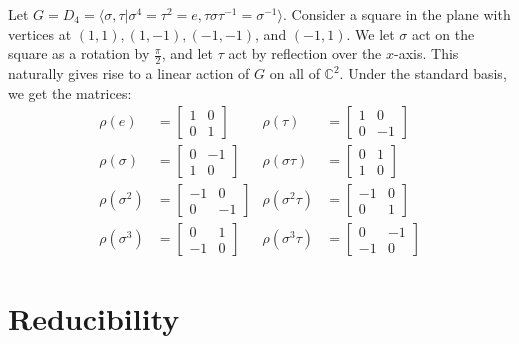 \begin{frame}[plain]
\begin{example}
Let $G = D_4 = \langle \sigma, \tau |  \sigma^4 = \tau^2 = e, \tau \sigma \tau^{-1} = \sigma^{-1} \rangle$.  \pause Consider a square in the plane with vertices at $(1,1), (1,-1), (-1, -1)$, and $(-1, 1)$.  \pause We let $\sigma$ act on the square as a rotation by $\frac{\pi}{2}$, and let $\tau$ act by reflection over the $x$-axis.  This naturally gives rise to a linear action of $G$ on all of $\mathbb{C}^2$.  \pause  Under the standard basis, we get the matrices:
\begin{align*}
\rho( e) &= \begin{bmatrix} 1 & 0 \\ 0 & 1\end{bmatrix}  &\rho (\tau) &= \begin{bmatrix} 1 & 0 \\ 0 & -1\end{bmatrix} \\
\rho (\sigma) &= \begin{bmatrix} 0 & -1 \\ 1 & 0  \end{bmatrix} & \rho (\sigma \tau ) &= \begin{bmatrix} 0 & 1 \\ 1 & 0\end{bmatrix} \\
\rho (\sigma^2) &= \begin{bmatrix} -1 & 0 \\ 0 & -1  \end{bmatrix} & \rho (\sigma^2 \tau) &= \begin{bmatrix} -1 & 0 \\ 0 & 1\end{bmatrix} \\
\rho (\sigma^3) &= \begin{bmatrix} 0 & 1 \\ -1 & 0  \end{bmatrix} & \rho (\sigma^3 \tau) &= \begin{bmatrix} 0 & -1 \\ -1 & 0\end{bmatrix}
\end{align*}
\end{example}
\end{frame}

\section{Reducibility}
